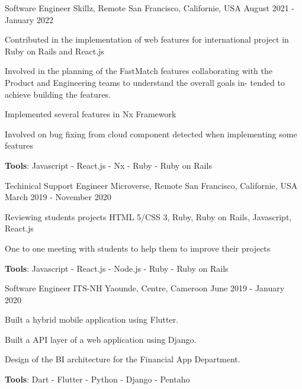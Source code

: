 \begin{cventries}
  \cventry
    {Software Engineer} %
    {Skillz, Remote} %
    {San Francisco, Californie, USA} %
    {August 2021 - January 2022} %
    {
      \begin{cvitems} %
        \item {Contributed in the implementation of web features for international project in Ruby on Rails and React.js}
        \item {Involved in the planning of the FastMatch features collaborating with the Product and Engineering teams to understand the overall goals in-
        tended to achieve building the features.}
        \item {Implemented several features in Nx Framework}
        \item {Involved on bug fixing from cloud component detected when implementing some features}
        \item {\textbf{Tools}: Javascript - React.js - Nx - Ruby - Ruby on Rails}
      \end{cvitems}
    }

  \cventry
    {Techinical Support Engineer} %
    {Microverse, Remote} %
    {San Francisco, Californie, USA} %
    {March 2019 - November 2020} %
    {
      \begin{cvitems} %
        \item {Reviewing students projects HTML 5/CSS 3, Ruby, Ruby on Rails, Javascript, React.js}
        \item {One to one meeting with students to help them to improve their projects}
        \item {\textbf{Tools}: Javascript - React.js - Node.js - Ruby - Ruby on Rails}
      \end{cvitems}
    }

  \cventry
    {Software Engineer} %
    {ITS-NH} %
    {Yaounde, Centre, Cameroon} %
    {June 2019 - January 2020} %
    {
      \begin{cvitems} %
        \item {Built a hybrid mobile application using Flutter.}
        \item {Built a API layer of a web application using Django.}
        \item {Design of the BI architecture for the Financial App Department.}
        \item {\textbf{Tools}: Dart - Flutter - Python - Django - Pentaho}
      \end{cvitems}
    }


\end{cventries}

